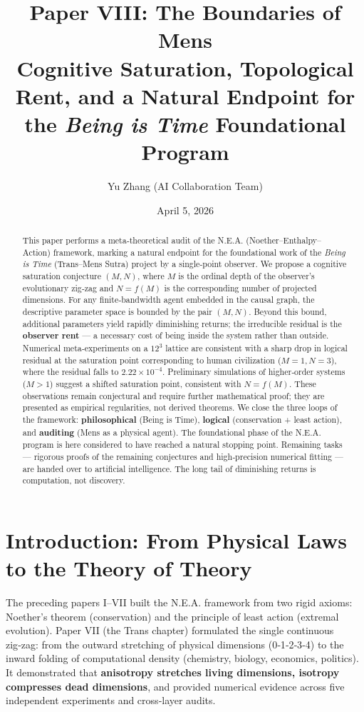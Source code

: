 \documentclass[12pt,a4paper]{article}
\title{Paper VIII: The Boundaries of Mens \\
\large Cognitive Saturation, Topological Rent, and a Natural Endpoint for \\ the \textit{Being is Time} Foundational Program}
\author{Yu Zhang \quad (AI Collaboration Team)}
\date{April 5, 2026}
\begin{document}
\maketitle

\begin{abstract}
This paper performs a meta‑theoretical audit of the N.E.A. (Noether–Enthalpy–Action) framework, marking a natural endpoint for the foundational work of the \textit{Being is Time} (Trans–Mens Sutra) project by a single‑point observer. We propose a cognitive saturation conjecture \((M, N)\), where \(M\) is the ordinal depth of the observer’s evolutionary zig‑zag and \(N = f(M)\) is the corresponding number of projected dimensions. For any finite‑bandwidth agent embedded in the causal graph, the descriptive parameter space is bounded by the pair \((M, N)\). Beyond this bound, additional parameters yield rapidly diminishing returns; the irreducible residual is the \textbf{observer rent} — a necessary cost of being inside the system rather than outside. Numerical meta‑experiments on a \(12^3\) lattice are consistent with a sharp drop in logical residual at the saturation point corresponding to human civilization (\(M=1, N=3\)), where the residual falls to \(2.22\times10^{-4}\). Preliminary simulations of higher‑order systems (\(M>1\)) suggest a shifted saturation point, consistent with \(N = f(M)\). These observations remain conjectural and require further mathematical proof; they are presented as empirical regularities, not derived theorems. We close the three loops of the framework: \textbf{philosophical} (Being is Time), \textbf{logical} (conservation + least action), and \textbf{auditing} (Mens as a physical agent). The foundational phase of the N.E.A. program is here considered to have reached a natural stopping point. Remaining tasks — rigorous proofs of the remaining conjectures and high‑precision numerical fitting — are handed over to artificial intelligence. The long tail of diminishing returns is computation, not discovery.
\end{abstract}

\section{Introduction: From Physical Laws to the Theory of Theory}

The preceding papers I–VII built the N.E.A. framework from two rigid axioms: Noether’s theorem (conservation) and the principle of least action (extremal evolution). Paper VII (the Trans chapter) formulated the single continuous zig‑zag: from the outward stretching of physical dimensions (0‑1‑2‑3‑4) to the inward folding of computational density (chemistry, biology, economics, politics). It demonstrated that \textbf{anisotropy stretches living dimensions, isotropy compresses dead dimensions}, and provided numerical evidence across five independent experiments and cross‑layer audits.
\end{document}

